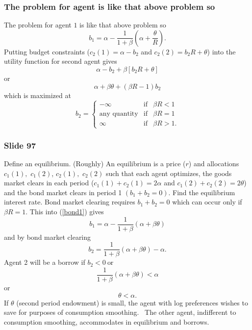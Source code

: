 \documentclass[aspectratio=169]{ltx-talk}
\begin{document}
\begin{frame}
\frametitle{The problem for agent is like that above problem so}
The problem for agent $1$ is like that above problem so 
\begin{equation}
b_{1}=\alpha -\frac{1}{1+\beta }\left( \alpha +\frac{\theta }{R}\right) .
\label{bond1}
\end{equation}%
Putting budget constraints ($c_{2}\left( 1\right) =\alpha -b_{2}$ and $%
c_{2}\left( 2\right) =b_{2}R+\theta $) into the utility function for second
agent gives 
\begin{equation*}
\alpha -b_{2}+\beta \left[ b_{2}R+\theta \right]
\end{equation*}%
or 
\begin{equation*}
\alpha +\beta \theta +\left( \beta R-1\right) b_{2}
\end{equation*}%
which is maximized at%
\begin{equation*}
b_{2}=\left\{ 
\begin{array}{ccc}
-\infty & \text{if} & \beta R<1 \\ 
\text{any quantity} & \text{if} & \beta R=1 \\ 
\infty & \text{if} & \beta R>1.%
\end{array}%
\right.
\end{equation*}
\end{frame}

\begin{frame}
\frametitle{Slide 97}
Define an equilibrium. (Roughly) An equilibrium is a price ($r$) and
allocations $c_{1}\left( 1\right) ,$ $c_{1}\left( 2\right) $, $c_{2}\left(
1\right) ,$ $c_{2}\left( 2\right) $ such that each agent optimizes, the
goods market clears in each period ($c_{1}\left( 1\right) +c_{2}\left(
1\right) =2\alpha $ and $c_{1}\left( 2\right) +c_{2}\left( 2\right) =2\theta 
$) and the bond market clears in period 1 $\left( b_{1}+b_{2}=0\right) .$
Find the equilibrium interest rate. Bond market clearing requires $%
b_{1}+b_{2}=0$ which can occur only if $\beta R=1.$ This into (\ref{bond1})
gives%
\begin{equation*}
b_{1}=\alpha -\frac{1}{1+\beta }\left( \alpha +\beta \theta \right)
\end{equation*}%
and by bond market clearing 
\begin{equation*}
b_{2}=\frac{1}{1+\beta }\left( \alpha +\beta \theta \right) -\alpha .
\end{equation*}%
Agent 2 will be a borrow if $b_{2}<0\ $or 
\begin{equation*}
\frac{1}{1+\beta }\left( \alpha +\beta \theta \right) <\alpha
\end{equation*}%
or%
\begin{equation*}
\theta <\alpha .
\end{equation*}%
If $\theta $ (second period endowment) is small, the agent with log
preferences wishes to save for purposes of consumption smoothing. \ The
other agent, indifferent to consumption smoothing, accommodates in
equilibrium and borrows.
\end{frame}
\end{document}
